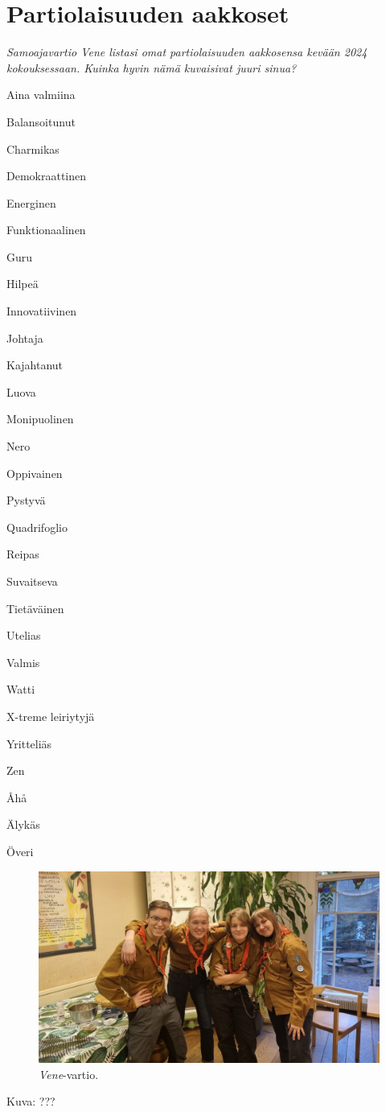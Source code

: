 \section{Partiolaisuuden aakkoset}

\textit{Samoajavartio Vene listasi omat partiolaisuuden aakkosensa kevään 
2024 kokouksessaan. Kuinka hyvin nämä kuvaisivat juuri sinua?}

\begin{multicols}{3}
\setlength{\parindent}{0em}\setlength{\parskip}{.5em} {\large A}ina valmiina

{\large B}alansoitunut

{\large C}harmikas

{\large D}emokraattinen

{\large E}nerginen

{\large F}unktionaalinen

{\large G}uru

{\large H}ilpeä

{\large I}nnovatiivinen

{\large J}ohtaja

{\large K}ajahtanut

{\large L}uova

{\large M}onipuolinen

{\large N}ero

{\large O}ppivainen

{\large P}ystyvä

{\large Q}uadrifoglio

{\large R}eipas

{\large S}uvaitseva

{\large T}ietäväinen

{\large U}telias

{\large V}almis

{\large W}atti

{\large X}-treme leiriytyjä

{\large Y}ritteliäs

{\large Z}en

{\large Å}hå

{\large Ä}lykäs

{\large Ö}veri
\end{multicols}

\begin{figure}[!h]
\centering\includegraphics[width=\textwidth]{assets/vene}
\caption{\textit{Vene}-vartio.}
\end{figure}

\medskip

\noindent\null\hfill Kuva: ???
